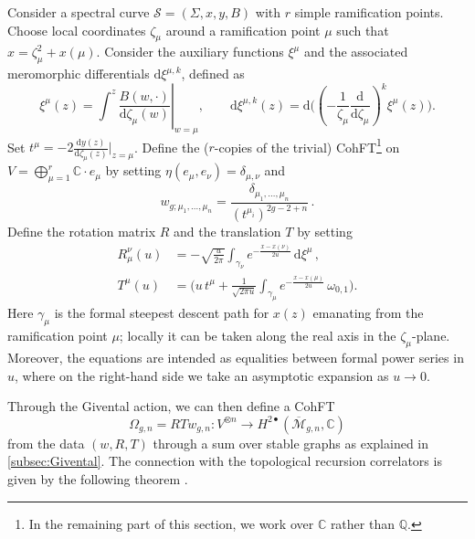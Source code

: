 \documentclass[11pt,reqno]{amsart}
\numberwithin{equation}{section}
\newcommand{\dd}{\mathrm{d}}
\newcommand{\mb}[1]{\mathbb{#1}}
\newcommand{\mc}[1]{\mathcal{#1}}
\newcommand{\Q}{\mb{Q}}
\newcommand{\C}{\mb{C}}
\newcommand{\M}{\mc{M}}
\newcommand{\Mbar}{\overline{\M}}
\theoremstyle{plain}
\theoremstyle{definition}
\begin{document}
Consider a spectral curve $\mc{S} = (\Sigma,x,y,B)$ with $r$ simple ramification points. Choose local coordinates $\zeta_\mu$ around a ramification point $\mu$ such that $x = \zeta_{\mu}^2 + x(\mu)$. Consider the auxiliary functions $\xi^{\mu}$ and the associated meromorphic differentials $\dd\xi^{\mu,k}$, defined as
\begin{equation}
  \xi^\mu(z)
  =
  \int^z \left.\frac{B(w,\cdot)}{\dd\zeta_{\mu}(w)}\right|_{w = \mu},
  \qquad
  \dd\xi^{\mu,k}(z)
  =
  \dd\biggl( \left( - \frac{1}{\zeta_{\mu}} \frac{\dd}{\dd\zeta_{\mu}} \right)^{k} \xi^{\mu}(z) \biggr).
\end{equation}
Set $t^{\mu} = -2 \frac{\dd y(z)}{\dd\zeta_{\mu}(z)} \big|_{z = \mu}$. Define the ($r$-copies of the trivial) CohFT\footnote{
  In the remaining part of this section, we work over $\C$ rather than $\Q$.
} on $V = \bigoplus_{\mu = 1}^r \C \cdot e_{\mu}$ by setting $\eta(e_{\mu},e_{\nu}) = \delta_{\mu,\nu}$ and
\begin{equation}
  w_{g;\mu_1,\ldots,\mu_n} = \frac{\delta_{\mu_1,\ldots,\mu_n}}{(t^{\mu_i})^{2g-2+n}} \,.
\end{equation}
Define the rotation matrix $R$ and the translation $T$ by setting
\begin{align}
  \label{eq:rotation:TR}
  R^{\nu}_{\mu}(u)
  & =
  - \sqrt{\frac{u}{2\pi}} \int_{\gamma_{\nu}}
    e^{-\frac{x - x(\nu)}{2u}} \,
    \dd\xi^\mu
    \,, \\
  \label{eq:translation:TR}
  T^{\mu}(u)
  & =
  \Biggl(
    u \, t^{\mu}
    +
    \frac{1}{\sqrt{2\pi u}}
    \int_{\gamma_{\mu}}
      e^{-\frac{x - x(\mu)}{2u}} \,
      \omega_{0,1}
  \Biggr).
\end{align}
Here $\gamma_{\mu}$ is the formal steepest descent path for $x(z)$ emanating from the ramification point $\mu$; locally it can be taken along the real axis in the $\zeta_{\mu}$-plane. Moreover, the equations are intended as equalities between formal power series in $u$, where on the right-hand side we take an asymptotic expansion as $u \to 0$.

Through the Givental action, we can then define a CohFT
\begin{equation}\label{eq:CohFT:TR}
  \Omega_{g,n} = RTw_{g,n} \colon V^{\otimes n} \longrightarrow H^{2\bullet}(\Mbar_{g,n},\C)
\end{equation}
from the data $(w,R,T)$ through a sum over stable graphs as explained in \cref{subsec:Givental}. The connection with the topological recursion correlators is given by the following theorem \cite{Eyn14b,DOSS14}.
\end{document}
